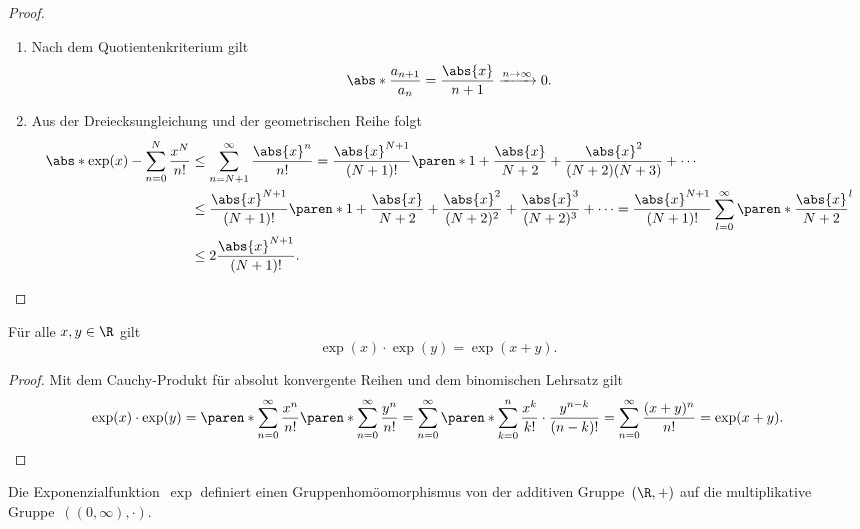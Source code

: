 \documentclass[a4paper]{article}
\begin{document}
\begin{proof}\leavevmode
    \begin{enumerate}
        \item Nach dem Quotientenkriterium gilt
              \begin{equation*}
                  \abs*{\frac{a_{n+1}}{a_n}} = \frac{\abs{x}}{n+1} \xrightarrow{n\to\infty} 0.
              \end{equation*}
        \item Aus der Dreiecksungleichung und der geometrischen Reihe folgt
              \begin{align*}
                  \abs*{\exp(x) - \sum_{n=0}^N \frac{x^N}{n!}} & \leq \sum_{n=N+1}^\infty \frac{\abs{x}^n}{n!} = \frac{\abs{x}^{N+1}}{(N+1)!} \paren*{1 + \frac{\abs{x}}{N+2} + \frac{\abs{x}^2}{(N+2)(N+3)} + \cdots}                                                               \\
                                                               & \leq \frac{\abs{x}^{N+1}}{(N+1)!} \paren*{1 + \frac{\abs{x}}{N+2} + \frac{\abs{x}^2}{(N+2)^2} + \frac{\abs{x}^3}{(N+2)^3} + \cdots} = \frac{\abs{x}^{N+1}}{(N+1)!} \sum_{l=0}^\infty \paren*{\frac{\abs{x}}{N+2}}^l \\
                                                               & \leq 2\frac{\abs{x}^{N+1}}{(N+1)!}. \qedhere
              \end{align*}
    \end{enumerate}
\end{proof}

\begin{theorem}[Funktionalgleichung]
    Für alle $x,y \in \R$ gilt
    \begin{equation*}
        \exp(x) \cdot \exp(y) = \exp(x+y).
    \end{equation*}
\end{theorem}

\begin{proof}
    Mit dem Cauchy-Produkt für absolut konvergente Reihen und dem binomischen Lehrsatz gilt
    \begin{equation*}
        \exp(x) \cdot \exp(y) = \paren*{\sum_{n=0}^\infty \frac{x^n}{n!}} \paren*{\sum_{n=0}^\infty \frac{y^n}{n!}} = \sum_{n=0}^\infty \paren*{\sum_{k=0}^n \frac{x^k}{k!} \cdot \frac{y^{n-k}}{(n-k)!}} = \sum_{n=0}^\infty \frac{(x+y)^n}{n!} = \exp(x+y). \qedhere
    \end{equation*}
\end{proof}

\begin{remark}
    Die Exponenzialfunktion~$\exp$ definiert einen Gruppenhomöomorphismus von der additiven Gruppe~$(\R,+)$ auf die multiplikative Gruppe~$((0,\infty),\cdot)$.
\end{remark}
\end{document}

